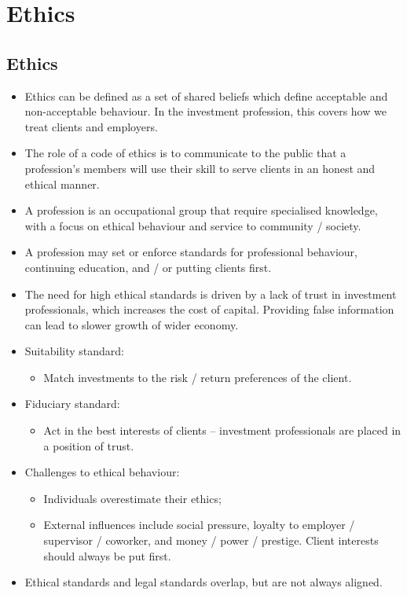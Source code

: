 \documentclass[../notes_compiled.tex]{subfiles}
\begin{document}
\section{Ethics}
\subsection{Ethics}
\begin{itemize}
\item Ethics can be defined as a set of shared beliefs which define acceptable and non-acceptable behaviour. In the investment profession, this covers how we treat clients and employers.
\item The role of a code of ethics is to communicate to the public that a profession’s members will use their skill to serve clients in an honest and ethical manner.
\item A profession is an occupational group that require specialised knowledge, with a focus on ethical behaviour and service to community / society.
\item A profession may set or enforce standards for professional behaviour, continuing education, and / or putting clients first.
\item The need for high ethical standards is driven by a lack of trust in investment professionals, which increases the cost of capital. Providing false information can lead to slower growth of wider economy.
\item Suitability standard:
\begin{itemize}
\item Match investments to the risk / return preferences of the client.
\end{itemize}
\item Fiduciary standard:
\begin{itemize}
\item Act in the best interests of clients -- investment professionals are placed in a position of trust.
\end{itemize}
\item Challenges to ethical behaviour:
\begin{itemize}
\item Individuals overestimate their ethics;
\item External influences include social pressure, loyalty to employer / supervisor / coworker, and money / power / prestige. Client interests should always be put first.
\end{itemize}
\item Ethical standards and legal standards overlap, but are not always aligned.

\end{itemize}
\end{document}
